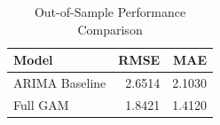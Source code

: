 \begin{table}[htbp]
\centering
\caption{Out-of-Sample Performance Comparison}
\label{tab:model_comparison}
\begin{tabular}{lrr}
\toprule
Model & RMSE & MAE \\
\midrule
ARIMA Baseline & 2.6514 & 2.1030 \\
Full GAM & 1.8421 & 1.4120 \\
\bottomrule
\end{tabular}
\end{table}

